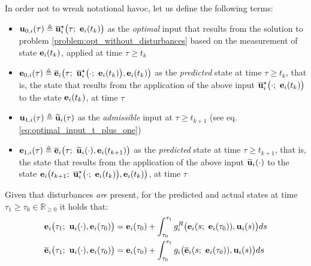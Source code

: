 In order not to wreak notational havoc, let us define the following terms:
\begin{gg_box}
\begin{itemize}
  \item $\bm{\mathbf{u}}_{0,i}(\tau) \triangleq \overline{\bm{\mathbf{u}}}_i^{\star}\big(\tau;\ \bm{\mathbf{e}}_i(t_k)\big)$
    as the \textit{optimal} input that results from the solution to problem
    \eqref{problem:opt_without_disturbances} based on the measurement of state
    $\bm{\mathbf{e}}_i(t_k)$, applied at time $\tau \geq t_k$
  \item $\vect{e}_{0,i}(\tau) \triangleq \overline{\vect{e}}_i\big(\tau;\ \overline{\vect{u}}_i^{\star}\big(\cdot;\ \vect{e}_i(t_k)\big), \vect{e}_i(t_k)\big)$
    as the \textit{predicted} state at time $\tau \geq t_k$, that is,
    the state that results from the application of the above input
    $\overline{\vect{u}}_i^{\star}\big(\cdot;\ \vect{e}_i(t_k)\big)$ to the
    state $\bm{\mathbf{e}}_i(t_k)$, at time $\tau$
  \item $\bm{\mathbf{u}}_{1,i}(\tau) \triangleq \widetilde{\bm{\mathbf{u}}}_i(\tau)$
    as the \textit{admissible} input at $\tau \geq t_{k+1}$ (see eq. \eqref{eq:optimal_input_t_plus_one})
  \item $\bm{\mathbf{e}}_{1,i}(\tau) \triangleq \overline{\bm{\mathbf{e}}}_i\big(\tau;\ \widetilde{\bm{\mathbf{u}}}_i(\cdot), \bm{\mathbf{e}}_i(t_{k+1})\big)$
    as the \textit{predicted} state at time $\tau \geq t_{k+1}$, that is,
    the state that results from the application of the above input
    $\widetilde{\bm{\mathbf{u}}}_i(\cdot)$ to the state
    $\vect{e}_i\big(t_{k+1};\ \overline{\vect{u}}_i^{\star}\big(\cdot;\ \vect{e}_i(t_k)\big), \vect{e}_i(t_k)\big)$, at time $\tau$
\end{itemize}
\end{gg_box}

\begin{bw_box}
  \begin{remark}
    Given that disturbances \textit{are} present, for the predicted and actual
    states at time $\tau_1 \geq \tau_0 \in \mathbb{R}_{\geq 0}$ it holds that:
    \begin{align}
      \bm{\mathbf{e}}_i\big(\tau_1;\ \bm{\mathbf{u}}_i(\cdot), \bm{\mathbf{e}}_i(\tau_0)\big) &=
        \bm{\mathbf{e}}_i(\tau_0) + \int_{\tau_0}^{\tau_1} g_i^R\big(\bm{\mathbf{e}}_i(s;\ \bm{\mathbf{e}}_i(\tau_0)), \bm{\mathbf{u}}_i(s)\big) ds \\
      \overline{\bm{\mathbf{e}}}_i\big(\tau_1;\ \bm{\mathbf{u}}_i(\cdot), \bm{\mathbf{e}}_i(\tau_0)\big) &=
        \bm{\mathbf{e}}_i(\tau_0) + \int_{\tau_0}^{\tau_1} g_i\big(\overline{\bm{\mathbf{e}}}_i(s;\ \bm{\mathbf{e}}_i(\tau_0)), \bm{\mathbf{u}}_i(s)\big) ds
    \end{align}
    \label{remark:predicted_actual_equations_with_disturbance}
  \end{remark}
\end{bw_box}

